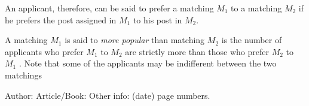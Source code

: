 \documentclass{llncs}
\begin{document}
An applicant, therefore, can be said to prefer a matching $M_1$ to a matching $M_2$ if he prefers the post assigned in $M_1$ to his post in  $M_2$.  

A matching $M_1$ is said to \emph{more popular} than matching $M_2$ is the number of applicants who prefer $M_1$ to $M_2$ are strictly more than those who prefer $M_2$ to $M_1$ .  
Note that some of the applicants may be indifferent between the two matchings 



























%
%

\begin{thebibliography}{1}
Author:
Article/Book:
Other info: (date) page numbers.
\end{thebibliography}
\end{document}
